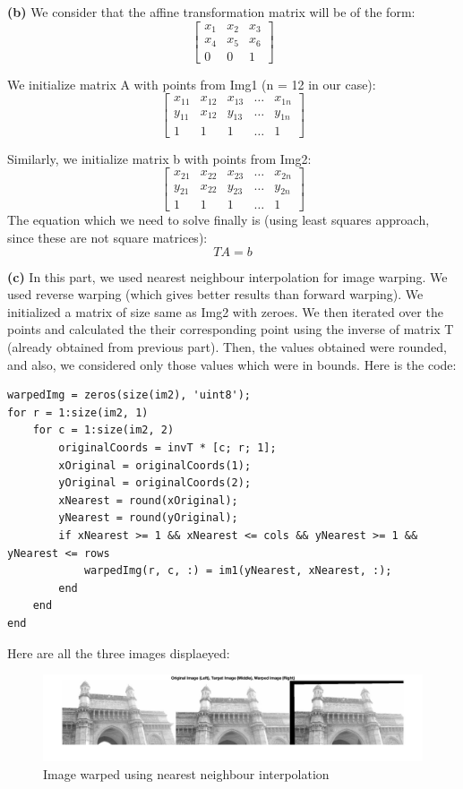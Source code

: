 \documentclass[12pt]{article}
\begin{document}
\textbf{(b)}
We consider that the affine transformation matrix will be of the form:
\[
    \begin{bmatrix}
        x_1 & x_2 & x_3 \\
        x_4 & x_5 & x_6 \\
        0 & 0 & 1
    \end{bmatrix}
\]

We initialize matrix A with points from Img1 (n = 12 in our case):
\[
    \begin{bmatrix}
        x_{11} & x_{12} & x_{13} & \dots & x_{1n} \\
        y_{11} & x_{12} & y_{13} & \dots & y_{1n} \\
        1 & 1 & 1 & \dots & 1
    \end{bmatrix}
\]

Similarly, we initialize matrix b with points from Img2:
\[
    \begin{bmatrix}
        x_{21} & x_{22} & x_{23} & \dots & x_{2n} \\
        y_{21} & x_{22} & y_{23} & \dots & y_{2n} \\
        1 & 1 & 1 & \dots & 1
    \end{bmatrix}
\]
The equation which we need to solve finally is (using least squares approach, since these are not square matrices):
\[TA = b\]


\textbf{(c)}
In this part, we used nearest neighbour interpolation for image warping. We used reverse warping (which gives better results than forward warping). We initialized a matrix of size same as Img2 with zeroes. We then iterated over the points and calculated the their corresponding point using the inverse of matrix T (already obtained from previous part). Then, the values obtained were rounded, and also, we considered only those values which were in bounds. Here is the code:
\begin{verbatim}
warpedImg = zeros(size(im2), 'uint8');
for r = 1:size(im2, 1)
    for c = 1:size(im2, 2)
        originalCoords = invT * [c; r; 1];
        xOriginal = originalCoords(1);
        yOriginal = originalCoords(2);
        xNearest = round(xOriginal);
        yNearest = round(yOriginal);
        if xNearest >= 1 && xNearest <= cols && yNearest >= 1 && yNearest <= rows
            warpedImg(r, c, :) = im1(yNearest, xNearest, :);
        end
    end
end
\end{verbatim}

Here are all the three images displaeyed:

\begin{figure}[h]
    \centering
    \includegraphics[width=\linewidth]{Images/Q6/nearest.jpg}
    \caption{Image warped using nearest neighbour interpolation}
\end{figure}
\end{document}
